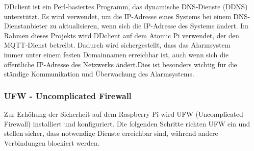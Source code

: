 DDclient ist ein Perl-basiertes Programm, das dynamische DNS-Dienste (DDNS) unterstützt. Es wird verwendet, um die IP-Adresse eines Systems bei einem DNS-Dienstanbieter zu aktualisieren, wenn sich die IP-Adresse des Systems ändert. Im Rahmen dieses Projekts wird DDclient auf dem Atomic Pi verwendet, der den MQTT-Dienst betreibt. Dadurch wird sichergestellt, dass das Alarmsystem immer unter einem festen Domainnamen erreichbar ist, auch wenn sich die öffentliche IP-Adresse des Netzwerks ändert.Dies ist besonders wichtig für die ständige Kommunikation und Überwachung des Alarmsystems.


\subsubsection{UFW - Uncomplicated Firewall}

Zur Erhöhung der Sicherheit auf dem Raspberry Pi wird UFW (Uncomplicated Firewall) installiert und konfiguriert. Die folgenden Schritte richten UFW ein und stellen sicher, dass notwendige Dienste erreichbar sind, während andere Verbindungen blockiert werden.

